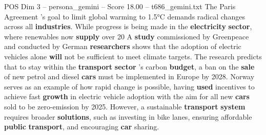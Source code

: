 \begin{textsample}{POS Dim 3 – persona\_gemini – Score 18.00 – t686\_gemini.txt}  \label{ex:f3_pos_046}
The Paris Agreement ’s goal to limit global warming to 1.5°C demands radical changes across all \textbf{industries}.
While progress is being made in the \textbf{electricity} \textbf{sector}, where renewables now \textbf{supply} over 20 %
A \textbf{study} commissioned by Greenpeace and conducted by German \textbf{researchers} shows that the adoption of electric vehicles alone \textbf{will} not be sufficient to meet climate targets.
The research predicts that to stay within the \textbf{transport} \textbf{sector} 's carbon \textbf{budget}, a ban on the \textbf{sale} of new petrol and diesel \textbf{cars} must be implemented in Europe by 2028.
Norway serves as an example of how rapid change is possible, having \textbf{used} incentives to achieve fast \textbf{growth} in electric vehicle adoption with the aim for all new \textbf{cars} sold to be zero-emission by 2025.
However, a sustainable \textbf{transport} \textbf{system} requires broader \textbf{solutions}, such as investing in bike lanes, ensuring affordable \textbf{public} \textbf{transport}, and encouraging \textbf{car} sharing.

\end{textsample}
